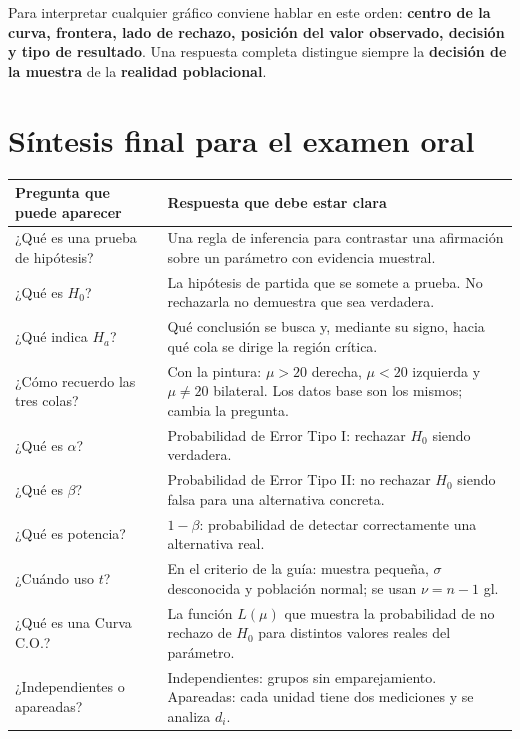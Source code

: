 \documentclass[11pt,a4paper]{article}
\begin{document}
\begin{oral}
Para interpretar cualquier gráfico conviene hablar en este orden: \textbf{centro de la curva, frontera, lado de rechazo, posición del valor observado, decisión y tipo de resultado}. Una respuesta completa distingue siempre la \textbf{decisión de la muestra} de la \textbf{realidad poblacional}.
\end{oral}

\section*{Síntesis final para el examen oral}

\begin{table}[H]
\centering
\small
\begin{tabularx}{\textwidth}{p{3.4cm}X}
\toprule
Pregunta que puede aparecer & Respuesta que debe estar clara \\
\midrule
¿Qué es una prueba de hipótesis? & Una regla de inferencia para contrastar una afirmación sobre un parámetro con evidencia muestral.\\
¿Qué es $H_0$? & La hipótesis de partida que se somete a prueba. No rechazarla no demuestra que sea verdadera.\\
¿Qué indica $H_a$? & Qué conclusión se busca y, mediante su signo, hacia qué cola se dirige la región crítica.\\
¿Cómo recuerdo las tres colas? & Con la pintura: $\mu>20$ derecha, $\mu<20$ izquierda y $\mu\neq20$ bilateral. Los datos base son los mismos; cambia la pregunta.\\
¿Qué es $\alpha$? & Probabilidad de Error Tipo I: rechazar $H_0$ siendo verdadera.\\
¿Qué es $\beta$? & Probabilidad de Error Tipo II: no rechazar $H_0$ siendo falsa para una alternativa concreta.\\
¿Qué es potencia? & $1-\beta$: probabilidad de detectar correctamente una alternativa real.\\
¿Cuándo uso $t$? & En el criterio de la guía: muestra pequeña, $\sigma$ desconocida y población normal; se usan $\nu=n-1$ gl.\\
¿Qué es una Curva C.O.? & La función $L(\mu)$ que muestra la probabilidad de no rechazo de $H_0$ para distintos valores reales del parámetro.\\
¿Independientes o apareadas? & Independientes: grupos sin emparejamiento. Apareadas: cada unidad tiene dos mediciones y se analiza $d_i$.\\
\bottomrule
\end{tabularx}
\end{table}
\end{document}
